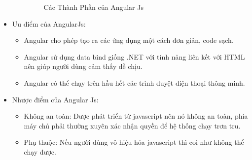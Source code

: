 \documentclass[12pt]{article}
\begin{document}
\begin{itemize}
\begin{itemize}
\begin{figure}[H]
\caption{Các Thành Phần của Angular Js}
\end{figure}
\end{itemize}
\item	Ưu điểm của AngularJs:
\begin{itemize}
 \item Angular cho phép tạo ra các ứng dụng một cách đơn giản, code sạch.
 \item Angular sử dụng data bind giống .NET với tính năng liên kết với HTML nên giúp người dùng cảm thấy dễ chịu.
 \item Angular có thể chạy trên hầu hết các trình duyệt điện thoại thông minh.
\end{itemize}
\item Nhược điểm của Angular Js:
\begin{itemize}
\item Không an toàn: Được phát triển từ javascript nên nó không an toàn, phía máy chủ phải thường xuyên xác nhận quyền để hệ thống chạy trơn tru.
\item Phụ thuộc: Nếu người dùng vô hiệu hóa javascript thì coi như không thể chạy được.
\end{itemize}
\end{itemize}
\end{document}
